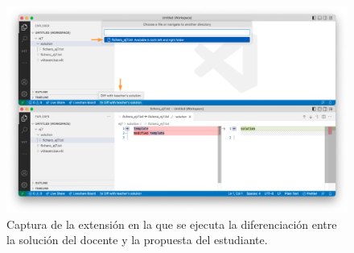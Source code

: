 \begin{figure}[ht]
    \centering
    \includegraphics[width=\textwidth]{imagenes/utilizadas/4-3-implementacion/rf8-1.png}
    \caption{Captura de la extensión en la que se ejecuta la diferenciación entre la solución del docente y la propuesta del estudiante.}
    \label{fig:reqf8-1}
\end{figure}
